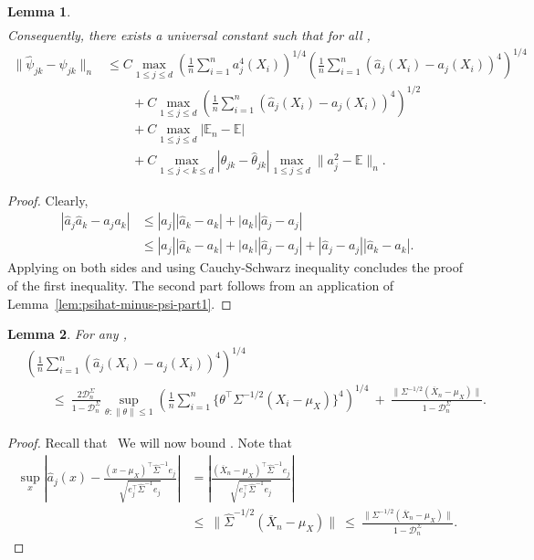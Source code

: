 \documentclass{article}
\newtheorem{lemma}{Lemma}
\begin{document}
\begin{appendices}
\begin{lemma}
\begin{align*}
\end{align*}
Consequently, there exists a universal constant   such that for all  ,
\begin{align*}
\|\widehat{\psi}_{jk} - \psi_{jk}\|_n &\le C\max_{1\le j\le d}\left(\frac{1}{n}\sum_{i=1}^n a_j^4(X_i)\right)^{1/4}\left(\frac{1}{n}\sum_{i=1}^n (\widehat{a}_j(X_i) - a_j(X_i))^4\right)^{1/4}\\ &\qquad+ C\max_{1\le j\le d}\left(\frac{1}{n}\sum_{i=1}^n (\widehat{a}_j(X_i) - a_j(X_i))^4\right)^{1/2}\\ &\qquad+ C\max_{1\le j\le d}|\mathbb{E}_n - \mathbb{E}|\\ &\qquad+ C\max_{1\le j < k\le d}|\theta_{jk} - \widehat{\theta}_{jk}|\max_{1\le j\le d}\|a_j^2 - \mathbb{E}\|_n.
\end{align*}
\end{lemma}
\begin{proof}
Clearly,
\begin{align*}
|\widehat{a}_j\widehat{a}_k - a_j a_k| &\le |\widehat{a}_j||\widehat{a}_k - a_k| + |a_k||\widehat{a}_j - a_j|\\ &\le |a_j||\widehat{a}_k - a_k| + |a_k||\widehat{a}_j - a_j| + |\widehat{a}_j - a_j||\widehat{a}_k - a_k|.
\end{align*}
Applying   on both sides and using Cauchy-Schwarz inequality concludes the proof of the first inequality. The second part follows from an application of Lemma~\ref{lem:psihat-minus-psi-part1}.
\end{proof}
\begin{lemma}\label{lem:ajhat-minus-aj}
For any  ,
\begin{align*}
&\left(\frac{1}{n}\sum_{i=1}^n (\widehat{a}_j(X_i) - a_j(X_i))^4\right)^{1/4}\\ ~&\qquad\le~ \frac{2\mathcal{D}_n^{\Sigma}}{1 - \mathcal{D}_n^{\Sigma}}\sup_{\theta:\|\theta\| \le 1}\left(\frac{1}{n}\sum_{i=1}^n{\{\theta^{\top}\Sigma^{-1/2}(X_i - \mu_X)\}^4}\right)^{1/4} ~+~ \frac{\|\Sigma^{-1/2}(\overline{X}_n - \mu_X)\|}{1 - \mathcal{D}_n^{\Sigma}}.
\end{align*}
\end{lemma}
\begin{proof}
Recall that
\ We will now bound  . Note that
\begin{align*}
\sup_{x}\left|\widehat{a}_j(x) - \frac{(x - \mu_{X})^{\top}\widehat{\Sigma}^{-1}e_j}{\sqrt{e_j^{\top}\widehat{\Sigma}^{-1}e_j}}\right| &= \left|\frac{(\overline{X}_n - \mu_X)^{\top}\widehat{\Sigma}^{-1}e_j}{\sqrt{e_j^{\top}\widehat{\Sigma}^{-1}e_j}}\right|\\ ~&\le~ \|\widehat{\Sigma}^{-1/2}(\overline{X}_n - \mu_X)\| ~\le~ \frac{\|\Sigma^{-1/2}(\overline{X}_n - \mu_X)\|}{1 - \mathcal{D}_n^{\Sigma}}.

\end{align*}
\end{proof}
\end{appendices}
\end{document}
